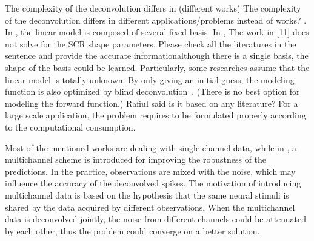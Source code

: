 \documentclass[10pt,conference]{ieeeconf}
\begin{document}
The complexity of the deconvolution differs in (different works) {\color{red}The complexity of the deconvolution differs in different applications/problems instead of works?} . In \cite{hernando2017feature}, the linear model is composed of several fixed basis. In \cite{greco2014electrodermal,greco2015cvxeda,amin2019tonic,wickramasuriya2019skin,kazemipour2017fast,amin2019robust}, {\color{red}The work in [11] does not solve for the SCR shape parameters. Please check all the literatures in the sentence and provide the accurate information}although there is a single basis, the shape of the basis could be learned. Particularly, some researches assume that the linear model is totally unknown. By only giving an initial guess, the modeling function is also optimized by blind deconvolution~\cite{kaur2016remote,friedrich2017fast}. (There is no best option for modeling the forward function.){\color{red} Rafiul said is it based on any literature?} For a large scale application, the problem requires to be formulated properly according to the computational consumption.

Most of the mentioned works are dealing with single channel data, while in \cite{friedrich2017fast,amin2019robust}, a multichannel scheme is introduced for improving the robustness of the predictions. In the practice, observations are mixed with the noise, which may influence the accuracy of the deconvolved spikes. The motivation of introducing multichannel data is based on the hypothesis that the same neural stimuli is shared by the data acquired by different observations. When the multichannel data is deconvolved jointly, the noise from different channels could be attenuated by each other, thus the problem could converge on a better solution.
\end{document}

